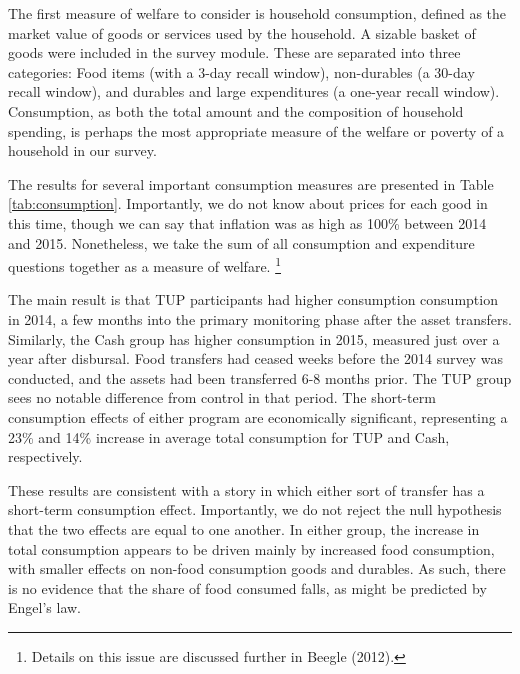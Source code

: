 \documentclass[12pt,article]{article}
\begin{document}
The first measure of welfare to consider is household consumption, defined as the market
value of goods or services used by the household. A sizable basket of goods were
included in the survey module. These are separated into three categories: Food items
(with a 3-day recall window), non-durables (a 30-day recall window), and durables
and large expenditures (a one-year recall window). Consumption, as both the total amount
and the composition of household spending, is perhaps the most appropriate
measure of the welfare or poverty of a household in our survey. 

The results for several important consumption measures are presented in Table
\ref{tab:consumption}. Importantly, we do not know about prices for each good in this
time, though we can say that inflation was as high as 100\% between 2014 and 2015.
Nonetheless, we take the sum of all consumption and expenditure questions together as
a measure of welfare. \footnote{Details on this issue are discussed further in Beegle
(2012).}

The main result is that TUP participants had higher consumption consumption in 2014,
a few months into the primary monitoring phase after the asset transfers. Similarly,
the Cash group has higher consumption in 2015, measured just over a year after
disbursal. Food transfers had ceased weeks before the 2014 survey was conducted, and
the assets had been transferred 6-8 months prior. The TUP group sees no notable
difference from control in that period. The short-term consumption effects of either
program are economically significant, representing a 23\% and 14\% increase in average
total consumption for TUP and Cash, respectively.

These results are consistent with a story in which either sort of transfer has a
short-term consumption effect. Importantly, we do not reject the null hypothesis that
the two effects are equal to one another. In either group, the increase in total
consumption appears to be driven mainly by increased food consumption, with smaller
effects on non-food consumption goods and durables. As such, there is no evidence
that the share of food consumed falls, as might be predicted by Engel's law.

\newpage
\end{document}
